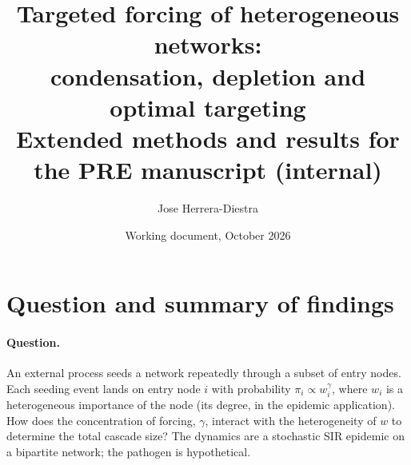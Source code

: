 \documentclass[11pt,a4paper]{article}
\title{Targeted forcing of heterogeneous networks:\\ condensation, depletion and optimal targeting\\[4pt]
\large Extended methods and results for the PRE manuscript (internal)}
\author{Jose Herrera-Diestra}
\date{Working document, October 2026}
\theoremstyle{definition}
\theoremstyle{remark}
\begin{document}
\maketitle
\tableofcontents
\newpage

\section{Question and summary of findings}
\paragraph{Question.} An external process seeds a network repeatedly through a
subset of entry nodes. Each seeding event lands on entry node $i$ with
probability $\pi_i\propto w_i^\gamma$, where $w_i$ is a heterogeneous importance of the node
(its degree, in the epidemic application). How does the concentration of
forcing, $\gamma$, interact with the heterogeneity of $w$ to determine the total
cascade size? The dynamics are a stochastic SIR epidemic on a bipartite
network; the pathogen is hypothetical.
\end{document}
